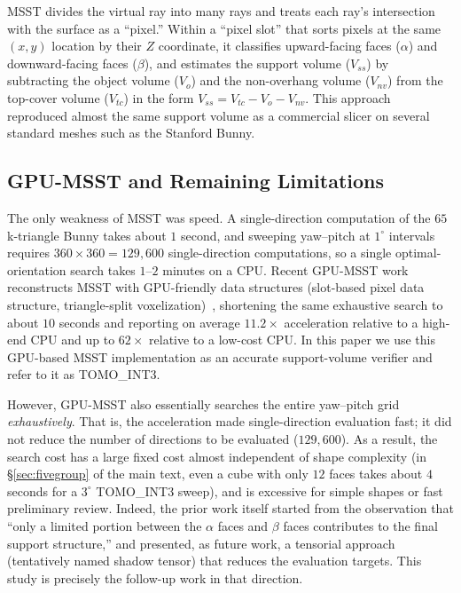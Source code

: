 \documentclass[11pt,a4paper]{article}
\begin{document}
MSST divides the virtual ray into many rays and treats each ray's intersection with the surface as a ``pixel.''
Within a ``pixel slot'' that sorts pixels at the same $(x,y)$ location by their $Z$ coordinate,
it classifies upward-facing faces ($\alpha$) and downward-facing faces ($\beta$),
and estimates the support volume ($V_{ss}$) by subtracting the object volume ($V_o$) and the
non-overhang volume ($V_{nv}$) from the top-cover volume ($V_{tc}$) in the form $V_{ss}=V_{tc}-V_o-V_{nv}$.
This approach reproduced almost the same support volume as a commercial slicer on several standard meshes such as the Stanford Bunny.

\subsection{GPU-MSST and Remaining Limitations}

The only weakness of MSST was speed.
A single-direction computation of the $65$k-triangle Bunny takes about $1$ second,
and sweeping yaw--pitch at $1^\circ$ intervals requires $360\times360=129{,}600$ single-direction computations,
so a single optimal-orientation search takes $1$--$2$ minutes on a CPU.
Recent GPU-MSST work reconstructs MSST with GPU-friendly data structures (slot-based pixel data structure, triangle-split voxelization)~\cite{gpumsst},
shortening the same exhaustive search to about $10$ seconds and reporting on average $11.2\times$ acceleration relative to a high-end CPU and up to $62\times$ relative to a low-cost CPU.
In this paper we use this GPU-based MSST implementation as an accurate support-volume verifier and refer to it as TOMO\_INT3.

However, GPU-MSST also essentially searches the entire yaw--pitch grid \emph{exhaustively}.
That is, the acceleration made single-direction evaluation fast; it did not reduce the number of directions to be evaluated ($129{,}600$).
As a result, the search cost has a large fixed cost almost independent of shape complexity
(in \S\ref{sec:fivegroup} of the main text, even a cube with only $12$ faces takes about $4$ seconds for a $3^\circ$ TOMO\_INT3 sweep),
and is excessive for simple shapes or fast preliminary review.
Indeed, the prior work itself started from the observation that ``only a limited portion between the $\alpha$ faces and $\beta$ faces contributes to the final support structure,''
and presented, as future work, a tensorial approach (tentatively named shadow tensor) that reduces the evaluation targets.
This study is precisely the follow-up work in that direction.
\end{document}
